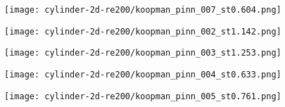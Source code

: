 \begin{figure*}[!hbt]
    \centering%
    \texttt{[image: cylinder-2d-re200/koopman\_pinn\_007\_st0.604.png]}%
    \caption{%
        The \num{4}th primary mode in data-driven PINN.
    }
    \label{fig:cylinder-re200-koopman-pinn-primary-4th}%
\end{figure*}

\begin{figure*}[!hbt]
    \centering%
    \texttt{[image: cylinder-2d-re200/koopman\_pinn\_002\_st1.142.png]}%
    \caption{%
        The \num{1}st damped mode in data-driven PINN.
    }
    \label{fig:cylinder-re200-koopman-pinn-damped-1st}%
\end{figure*}

\begin{figure*}[!hbt]
    \centering%
    \texttt{[image: cylinder-2d-re200/koopman\_pinn\_003\_st1.253.png]}%
    \caption{%
        The \num{2}nd damped mode in data-driven PINN.
    }
    \label{fig:cylinder-re200-koopman-pinn-damped-2nd}%
\end{figure*}

\begin{figure*}[!hbt]
    \centering%
    \texttt{[image: cylinder-2d-re200/koopman\_pinn\_004\_st0.633.png]}%
    \caption{%
        The \num{3}rd damped mode in data-driven PINN.
    }
    \label{fig:cylinder-re200-koopman-pinn-damped-3rd}%
\end{figure*}

\begin{figure*}[!hbt]
    \centering%
    \texttt{[image: cylinder-2d-re200/koopman\_pinn\_005\_st0.761.png]}%
    \caption{%
        The \num{4}th damped mode in data-driven PINN.
    }
    \label{fig:cylinder-re200-koopman-pinn-damped-4th}%
\end{figure*}

